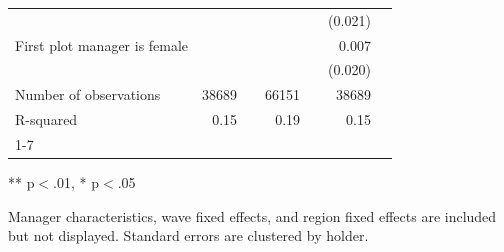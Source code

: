 \begin{table}[!h]
\begin{tabular}{lllllll}
\multicolumn{1}{l}{} &
  \multicolumn{1}{r}{} &
  \multicolumn{1}{l}{} &
  \multicolumn{1}{r}{} &
  \multicolumn{1}{l}{} &
  \multicolumn{1}{r}{(0.021)} &
  \multicolumn{1}{l}{} \\
\multicolumn{1}{l}{First plot manager is female} &
  \multicolumn{1}{r}{} &
  \multicolumn{1}{l}{} &
  \multicolumn{1}{r}{} &
  \multicolumn{1}{l}{} &
  \multicolumn{1}{r}{0.007} &
  \multicolumn{1}{l}{} \\
\multicolumn{1}{l}{} &
  \multicolumn{1}{r}{} &
  \multicolumn{1}{l}{} &
  \multicolumn{1}{r}{} &
  \multicolumn{1}{l}{} &
  \multicolumn{1}{r}{(0.020)} &
  \multicolumn{1}{l}{} \\
\multicolumn{1}{l}{Number of observations} &
  \multicolumn{1}{r}{38689} &
  \multicolumn{1}{l}{} &
  \multicolumn{1}{r}{66151} &
  \multicolumn{1}{l}{} &
  \multicolumn{1}{r}{38689} &
  \multicolumn{1}{l}{} \\
\multicolumn{1}{l}{R-squared} &
  \multicolumn{1}{r}{0.15} &
  \multicolumn{1}{l}{} &
  \multicolumn{1}{r}{0.19} &
  \multicolumn{1}{l}{} &
  \multicolumn{1}{r}{0.15} &
  \multicolumn{1}{l}{} \\
\cline{1-7}
\end{tabular}

\footnotesize{
** p$<$.01, * p$<$.05

Manager characteristics, wave fixed effects, and region fixed effects are included but not displayed. Standard errors are clustered by holder.
}
\end{table}
